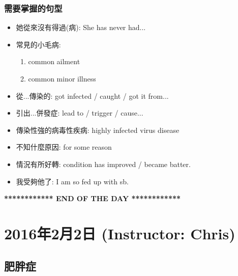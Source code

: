 \subsubsection*{需要掌握的句型}
\begin{multicols}{2}
\begin{itemize}
  \itemsep0em
  \item 她從來沒有得過(病): She has never had...
  \item 常見的小毛病:
  \begin{enumerate}
    \itemsep0em
    \item common ailment
    \item common minor illness
  \end{enumerate}
  \item 從...傳染的: got infected / caught / got it from...
  \item 引出...併發症: lead to / trigger / cause...
  \item 傳染性強的病毒性疾病: highly infected virus disease
  \item 不知什麼原因: for some reason
  \item 情況有所好轉: condition has improved / became batter.
  \item 我受夠他了: I am so fed up with sb.
\end{itemize}
\end{multicols}

\vspace{15mm}
\begin{center}
  \textbf{************ END OF THE DAY ************}
\end{center}
\newpage

\section{2016年2月2日 (Instructor: Chris)}
\subsection{肥胖症}
